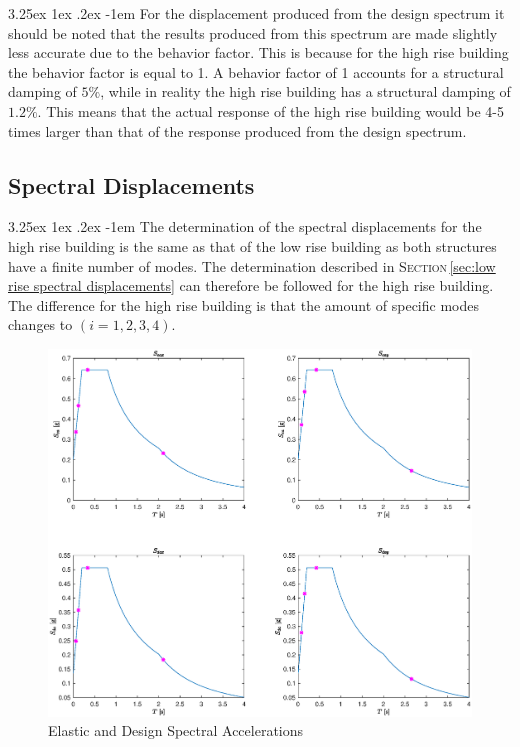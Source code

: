 \documentclass[11pt,a4paper,titlepage]{report}
\makeatletter
\renewcommand\paragraph{\@startsection{paragraph}{5}{\z@}%
  {3.25ex \@plus1ex \@minus.2ex}%
  {-1em}%
  {\normalfont\normalsize\bfseries}}
\makeatother
\begin{document}
\paragraph{}For the displacement produced from the design spectrum it should be noted that the results produced from this spectrum are made slightly less accurate due to the behavior factor. This is because for the high rise building the behavior factor is equal to 1. A behavior factor of 1 accounts for a structural damping of $5\%$, while in reality the high rise building has a structural damping of $1.2\%$. This means that the actual response of the high rise building would be 4-5 times larger than that of the response produced from the design spectrum. 
 
\subsection{Spectral Displacements}
\paragraph{}The determination of the spectral displacements for the high rise building is the same as that of the low rise building as both structures have a finite number of modes. The determination described in \textsc{Section}\,\ref{sec:low rise spectral displacements} can therefore be followed for the high rise building. The difference for the high rise building is that the amount of specific modes changes to $(i=1,2,3,4)$.
\begin{figure}
    \centering
    \includegraphics[width=16cm]{Spectral_Displacements_HR.eps}
    \caption{Elastic and Design Spectral Accelerations}
    \label{fig:my_label}
\end{figure}
\end{document}
